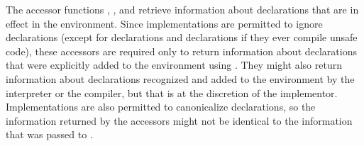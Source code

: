 The accessor functions , , and
  retrieve information about
 declarations that are in
 effect in the environment.  Since implementations are permitted to ignore
 declarations (except for  declarations and 
 declarations if they ever compile unsafe code), these accessors are required
 only to return information about declarations that were explicitly added to
 the environment using .  They might also return
 information about declarations recognized and added to the environment by the
 interpreter or the compiler, but that is at the discretion of the
 implementor.  Implementations are also permitted to canonicalize
 declarations, so the information returned by the accessors might not be
 identical to the information that was passed to .

